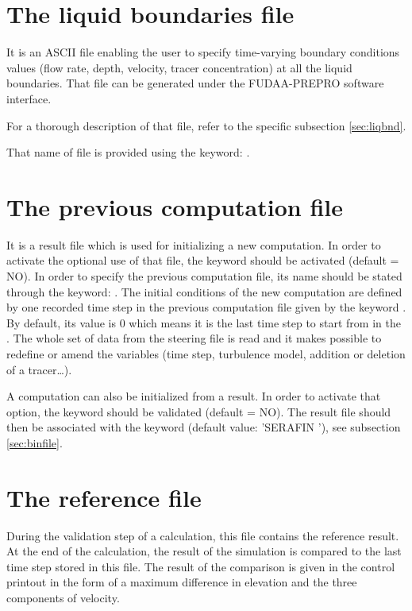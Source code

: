 \section{The liquid boundaries file}

It is an ASCII file enabling the user to specify time-varying boundary
conditions values (flow rate, depth, velocity, tracer concentration) at all the
liquid boundaries. That file can be generated under the FUDAA-PREPRO software
interface.

For a thorough description of that file, refer to the specific subsection
\ref{sec:liqbnd}.

That name of file is provided using the keyword: .


\section{The previous computation file}
\label{sec:previousfile}

It is a  result file which is used for initializing a new
computation. In order to activate the optional use of that file, the keyword
 should be activated (default = NO).
In order to specify the
previous computation file, its name should be stated through the keyword:
. The initial conditions of the new
computation are defined by one recorded time step in the previous
computation file given by the keyword .
By default, its value is 0 which means it is the last time step
to start from in the .
The whole set of data from the steering file is read and it
makes possible to redefine or amend the variables (time step, turbulence model,
addition or deletion of a tracer\dots).

A computation can also be initialized from a  result. In order to
activate that option, the  keyword
should be validated (default = NO).
The  result file should then be associated with
the  keyword (default
value: 'SERAFIN '), see subsection \ref{sec:binfile}.


\section{The reference file}

During the validation step of a calculation, this file contains the reference
result.
At the end of the calculation, the result of the simulation is compared to the
last time step stored in this file. The result of the comparison is given in
the control printout in the form of a maximum difference in elevation and the
three components of velocity.

